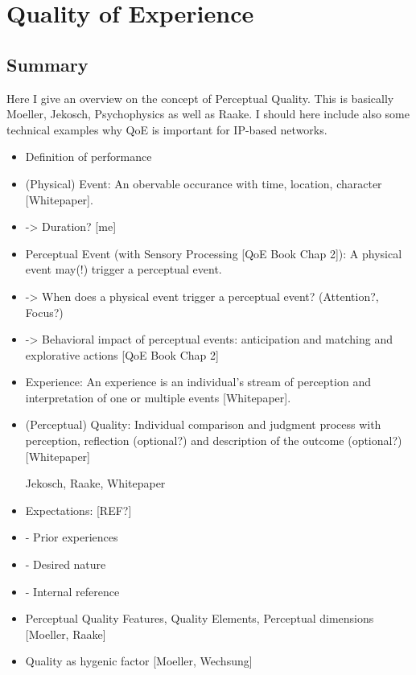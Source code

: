 \chapter{Quality of Experience}

\section*{Summary}
Here I give an overview on the concept of Perceptual Quality.
This is basically Moeller, Jekosch, Psychophysics as well as Raake.
I should here include also some technical examples why QoE is important for IP-based networks.

\begin{itemize}
\item Definition of performance
\item (Physical) Event: An obervable occurance with time, location, character [Whitepaper].
\item    -> Duration? [me]
    
\item Perceptual Event (with Sensory Processing [QoE Book Chap 2]): A physical event may(!) trigger a perceptual event.
\item -> When does a physical event trigger a perceptual event? (Attention?, Focus?)
\item -> Behavioral impact of perceptual events: anticipation and matching and explorative actions [QoE Book Chap 2]
    
\item Experience: An experience is an individual's stream of perception and interpretation of one or multiple events [Whitepaper].
\item (Perceptual) Quality: Individual comparison and judgment process with perception, reflection (optional?) and description of the outcome (optional?) [Whitepaper]
\item [Jekosch, Raake, Whitepaper]
    
\item Expectations: [REF?]
\item - Prior experiences
\item - Desired nature
\item - Internal reference

\item Perceptual Quality Features, Quality Elements, Perceptual dimensions [Moeller, Raake]
\item Quality as hygenic factor [Moeller, Wechsung]


\end{itemize}
